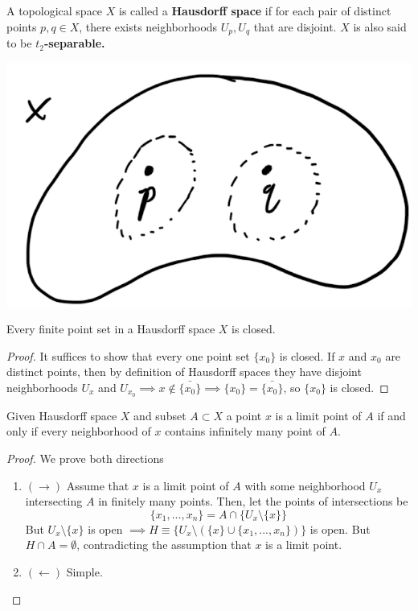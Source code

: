     \begin{definition}[T2-Separability]
      A topological space $X$ is called a \textbf{Hausdorff space} if for each pair of distinct points $p, q \in X$, there exists neighborhoods $U_p, U_q$ that are disjoint. $X$ is also said to be \textbf{$t_2$-separable.}
      \begin{center}
        \includegraphics[scale=0.35]{img/Hausdorff_Space_Separability.PNG}
      \end{center}
    \end{definition}

    \begin{theorem}
      Every finite point set in a Hausdorff space $X$ is closed. 
    \end{theorem}
    \begin{proof}
      It suffices to show that every one point set $\{x_0\}$ is closed. If $x$ and $x_0$ are distinct points, then by definition of Hausdorff spaces they have disjoint neighborhoods $U_x$ and $U_{x_0} \implies x \not\in \bar{\{x_0\}} \implies \{x_0\} = \bar{\{x_0\}}$, so $\{x_0\}$ is closed. 
    \end{proof}

    \begin{theorem}
      Given Hausdorff space $X$ and subset $A \subset X$ a point $x$ is a limit point of $A$ if and only if every neighborhood of $x$ contains infinitely many point of $A$. 
    \end{theorem}
    \begin{proof}
      We prove both directions
      \begin{enumerate}
        \item $(\rightarrow)$ Assume that $x$ is a limit point of $A$ with some neighborhood $U_x$ intersecting $A$ in finitely many points. Then, let the points of intersections be 
        \begin{equation}
          \{x_1, ..., x_n\} = A \cap \{U_x \setminus \{x\} \}
        \end{equation}
        But $U_x \setminus \{x\}$ is open $\implies H \equiv \{U_x \setminus ( \{x\} \cup \{x_1, ..., x_n\})\}$ is open. But $H \cap A = \emptyset$, contradicting the assumption that $x$ is a limit point. 

        \item $(\leftarrow)$ Simple. 
      \end{enumerate}
    \end{proof}

